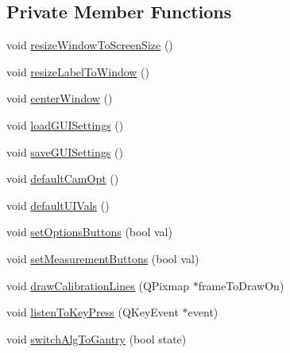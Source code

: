 \subsection*{Private Member Functions}
\begin{DoxyCompactItemize}
\item 
void \mbox{\hyperlink{classMainWindow_abf8d2aa0872c2072510bc93f9f9e4d11}{resize\+Window\+To\+Screen\+Size}} ()
\item 
void \mbox{\hyperlink{classMainWindow_a5e7a591198f61ccccbd9608a519dcd01}{resize\+Label\+To\+Window}} ()
\item 
void \mbox{\hyperlink{classMainWindow_a775d79cb8170d36faf4aa9ce4570d8b3}{center\+Window}} ()
\item 
void \mbox{\hyperlink{classMainWindow_ad0f8d1384a86ac65b996addd300ef620}{load\+G\+U\+I\+Settings}} ()
\item 
void \mbox{\hyperlink{classMainWindow_a0806c678c7280ab0a786526522f91418}{save\+G\+U\+I\+Settings}} ()
\item 
void \mbox{\hyperlink{classMainWindow_ad6c3df0bfe7f2357d3f2083e20e3810a}{default\+Cam\+Opt}} ()
\item 
void \mbox{\hyperlink{classMainWindow_a6021f4624cf5aa8ced6b210d388ac31d}{default\+U\+I\+Vals}} ()
\item 
void \mbox{\hyperlink{classMainWindow_a47326e5f671c05053baaa75a2a4059e7}{set\+Options\+Buttons}} (bool val)
\item 
void \mbox{\hyperlink{classMainWindow_aa6af159870a097c8347efae3a7c26e6f}{set\+Measurement\+Buttons}} (bool val)
\item 
void \mbox{\hyperlink{classMainWindow_a46d10bf790a404b85083416112d51c08}{draw\+Calibration\+Lines}} (Q\+Pixmap $\ast$frame\+To\+Draw\+On)
\item 
void \mbox{\hyperlink{classMainWindow_a1bc0cb9910e8898744ff85e8326bf73d}{listen\+To\+Key\+Press}} (Q\+Key\+Event $\ast$event)
\item 
void \mbox{\hyperlink{classMainWindow_a28c0f3e2856ce2c44ba3ddad62a302a6}{switch\+Alg\+To\+Gantry}} (bool state)
\end{DoxyCompactItemize}
